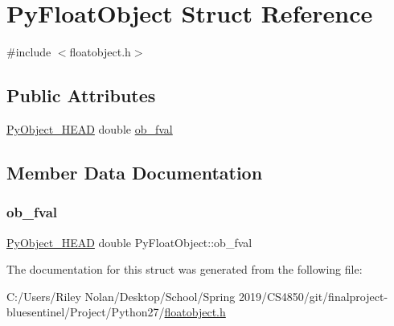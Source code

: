 \hypertarget{struct_py_float_object}{}\section{Py\+Float\+Object Struct Reference}
\label{struct_py_float_object}


{\ttfamily \#include $<$floatobject.\+h$>$}

\subsection*{Public Attributes}
\begin{DoxyCompactItemize}
\item 
\mbox{\hyperlink{_python27_2object_8h_a0bf35c1f3ea13f925de94d8593db3b7e}{Py\+Object\+\_\+\+H\+E\+AD}} double \mbox{\hyperlink{struct_py_float_object_ae7096f8767b95c9cf877f9c3cb03d4a2}{ob\+\_\+fval}}
\end{DoxyCompactItemize}


\subsection{Member Data Documentation}
\mbox{\label{struct_py_float_object_ae7096f8767b95c9cf877f9c3cb03d4a2}} 
\subsubsection{\texorpdfstring{ob\_fval}{ob\_fval}}
{\footnotesize\ttfamily \mbox{\hyperlink{_python27_2object_8h_a0bf35c1f3ea13f925de94d8593db3b7e}{Py\+Object\+\_\+\+H\+E\+AD}} double Py\+Float\+Object\+::ob\+\_\+fval}



The documentation for this struct was generated from the following file\+:\begin{DoxyCompactItemize}
\item 
C\+:/\+Users/\+Riley Nolan/\+Desktop/\+School/\+Spring 2019/\+C\+S4850/git/finalproject-\/bluesentinel/\+Project/\+Python27/\mbox{\hyperlink{floatobject_8h}{floatobject.\+h}}\end{DoxyCompactItemize}
